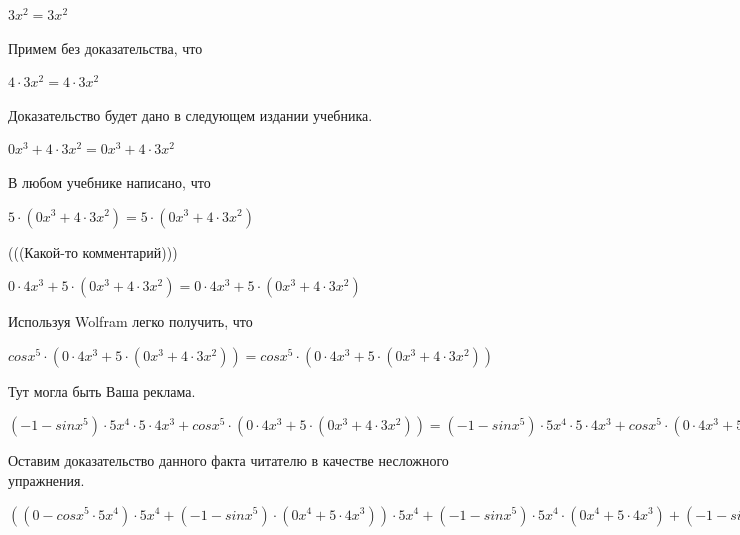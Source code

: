 \documentclass[12pt,a4paper,fleqn]{article}
\theoremstyle{definition}
\begin{document}
$ 3 { x }^{ 2 } =  3 { x }^{ 2 }$

Примем без доказательства, что 

$ 4  \cdot  3 { x }^{ 2 } =  4  \cdot  3 { x }^{ 2 }$

Доказательство будет дано в следующем издании учебника. 

$ 0 { x }^{ 3 } +  4  \cdot  3 { x }^{ 2 } =  0 { x }^{ 3 } +  4  \cdot  3 { x }^{ 2 }$

В любом учебнике написано, что 

$ 5  \cdot ( 0 { x }^{ 3 } +  4  \cdot  3 { x }^{ 2 }) =  5  \cdot ( 0 { x }^{ 3 } +  4  \cdot  3 { x }^{ 2 })$

(((Какой-то комментарий))) 

$ 0  \cdot  4 { x }^{ 3 } +  5  \cdot ( 0 { x }^{ 3 } +  4  \cdot  3 { x }^{ 2 }) =  0  \cdot  4 { x }^{ 3 } +  5  \cdot ( 0 { x }^{ 3 } +  4  \cdot  3 { x }^{ 2 })$

Используя Wolfram легко получить, что 

$cos{ x }^{ 5 } \cdot ( 0  \cdot  4 { x }^{ 3 } +  5  \cdot ( 0 { x }^{ 3 } +  4  \cdot  3 { x }^{ 2 })) = cos{ x }^{ 5 } \cdot ( 0  \cdot  4 { x }^{ 3 } +  5  \cdot ( 0 { x }^{ 3 } +  4  \cdot  3 { x }^{ 2 }))$

Тут могла быть Ваша реклама. 

$( -1  - sin{ x }^{ 5 }) \cdot  5 { x }^{ 4 } \cdot  5  \cdot  4 { x }^{ 3 } + cos{ x }^{ 5 } \cdot ( 0  \cdot  4 { x }^{ 3 } +  5  \cdot ( 0 { x }^{ 3 } +  4  \cdot  3 { x }^{ 2 })) = ( -1  - sin{ x }^{ 5 }) \cdot  5 { x }^{ 4 } \cdot  5  \cdot  4 { x }^{ 3 } + cos{ x }^{ 5 } \cdot ( 0  \cdot  4 { x }^{ 3 } +  5  \cdot ( 0 { x }^{ 3 } +  4  \cdot  3 { x }^{ 2 }))$

Оставим доказательство данного факта читателю в качестве несложного упражнения. 

$(( 0  - cos{ x }^{ 5 } \cdot  5 { x }^{ 4 }) \cdot  5 { x }^{ 4 } + ( -1  - sin{ x }^{ 5 }) \cdot ( 0 { x }^{ 4 } +  5  \cdot  4 { x }^{ 3 })) \cdot  5 { x }^{ 4 } + ( -1  - sin{ x }^{ 5 }) \cdot  5 { x }^{ 4 } \cdot ( 0 { x }^{ 4 } +  5  \cdot  4 { x }^{ 3 }) + ( -1  - sin{ x }^{ 5 }) \cdot  5 { x }^{ 4 } \cdot  5  \cdot  4 { x }^{ 3 } + cos{ x }^{ 5 } \cdot ( 0  \cdot  4 { x }^{ 3 } +  5  \cdot ( 0 { x }^{ 3 } +  4  \cdot  3 { x }^{ 2 })) = (( 0  - cos{ x }^{ 5 } \cdot  5 { x }^{ 4 }) \cdot  5 { x }^{ 4 } + ( -1  - sin{ x }^{ 5 }) \cdot ( 0 { x }^{ 4 } +  5  \cdot  4 { x }^{ 3 })) \cdot  5 { x }^{ 4 } + ( -1  - sin{ x }^{ 5 }) \cdot  5 { x }^{ 4 } \cdot ( 0 { x }^{ 4 } +  5  \cdot  4 { x }^{ 3 }) + ( -1  - sin{ x }^{ 5 }) \cdot  5 { x }^{ 4 } \cdot  5  \cdot  4 { x }^{ 3 } + cos{ x }^{ 5 } \cdot ( 0  \cdot  4 { x }^{ 3 } +  5  \cdot ( 0 { x }^{ 3 } +  4  \cdot  3 { x }^{ 2 }))$
\end{document}
